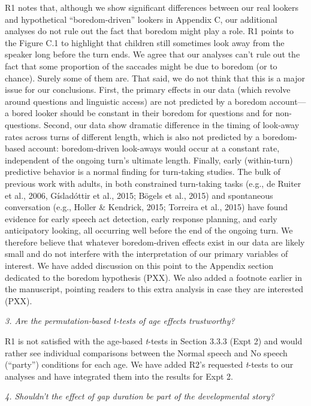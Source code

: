 \documentclass[11pt,a4paper]{letter} %
\begin{document}
\begin{letter}{}
\noindent R1 notes that, although we show significant differences between our real lookers and hypothetical ``boredom-driven'' lookers in Appendix C, our additional analyses do not rule out the fact that boredom might play a role. R1 points to the Figure C.1 to highlight that children still sometimes look away from the speaker long before the turn ends. We agree that our analyses can't rule out the fact that some proportion of the saccades might be due to boredom (or to chance). Surely some of them are. That said, we do not think that this is a major issue for our conclusions. First, the primary effects in our data (which revolve around questions and linguistic access) are not predicted by a boredom account---a bored looker should be constant in their boredom for questions and for non-questions.  Second, our data show dramatic difference in the timing of look-away rates across turns of different length, which is also not predicted by a boredom-based account: boredom-driven look-aways would occur at a constant rate, independent of the ongoing turn's ultimate length. Finally, early (within-turn) predictive behavior is a normal finding for turn-taking studies. The bulk of previous work with adults, in both constrained turn-taking tasks (e.g., de Ruiter et al., 2006, G\'{i}slad\'{o}ttir et al., 2015; B\"{o}gels et al., 2015) and spontaneous conversation (e.g., Holler \& Kendrick, 2015; Torreira et al., 2015) have found evidence for early speech act detection, early response planning, and early anticipatory looking, all occurring well before the end of the ongoing turn. We therefore believe that whatever boredom-driven effects exist in our data are likely small and do not interfere with the interpretation of our primary variables of interest. We have added discussion on this point to the Appendix section dedicated to the boredom hypothesis (PXX). We also added a footnote earlier in the manuscript, pointing readers to this extra analysis in case they are interested (PXX).

\noindent \textit{3. Are the permutation-based t-tests of age effects trustworthy?}

\noindent R1 is not satisfied with the age-based \textit{t}-tests in Section 3.3.3 (Expt 2) and would rather see individual comparisons between the Normal speech and No speech (``party'') conditions for each age. We have added R2's requested \textit{t}-tests to our analyses and have integrated them into the results for Expt 2.

\noindent \textit{4. Shouldn't the effect of gap duration be part of the developmental story?}


\end{letter}
\end{document}
